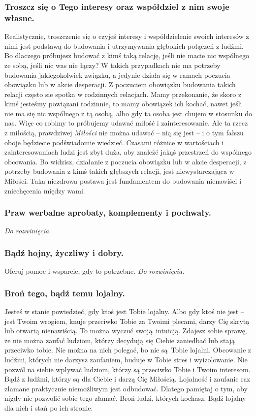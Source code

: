 \documentclass[../dotknieci-miloscia.tex]{subfiles}
\begin{document}
\subsubsection{Troszcz się o Tego interesy oraz współdziel z nim swoje własne.}
Realistycznie, troszczenie się o czyjeś interesy i współdzielenie swoich interesów z nimi 
jest podstawą do budowania i utrzymywania głębokich połączeń z ludźmi. 
Bo dlaczego próbujesz budować z kimś taką relację, 
jeśli nie macie nic wspólnego ze sobą, jeśli nic was nie łączy? 
W takich przypadkach nie ma potrzeby budowania jakiegokolwiek związku, 
a jedynie działa się w ramach poczucia obowiązku lub w akcie desperacji. 
Z poczuciem obowiązku budowania takich relacji często sie spotka w rodzinnych relacjach. 
Mamy przekonanie, że skoro z kimś jesteśmy powiązani rodzinnie,
to mamy obowiązek ich kochać, nawet jeśli nie ma się nic wspólnego z tą osobą, 
albo gdy ta osoba jest chujem w stosunku do nas. 
Więc co robimy to próbujemy udawać miłość i zainteresowanie. 
Ale ta rzecz z miłością, prawdziwej \emph{Miłości} nie można udawać 
-- nią się jest -- i o tym fałszu oboje będziecie podświadomie wiedzieć.
Czasami różnice w wartościach i zainteresowaniach ludzi jest zbyt duża, 
aby znaleźć jakąś przestrzeń do wspólnego obcowania. 
Bo widzisz, działanie z poczucia obowiązku lub w akcie desperacji, 
z potrzeby budowania z kimś takich głębszych relacji, jest niewystarczająca w Miłości. 
Taka niezdrowa postawa jest fundamentem do budowania nienawiści i zniechęcenia między wami. 

\subsubsection{Praw werbalne aprobaty, komplementy i pochwały.}
\emph{Do rozwinięcia.}

\subsubsection{Bądź hojny, życzliwy i dobry.}
Oferuj pomoc i wsparcie, gdy to potrzebne.
\emph{Do rozwinięcia.}

\subsubsection{Broń tego, bądź temu lojalny.}
Jesteś w stanie powiedzieć, gdy ktoś jest Tobie lojalny.
Albo gdy ktoś nie jest -- jest Twoim wrogiem, knuje przeciwko Tobie za Twoimi plecami, 
darzy Cię skrytą lub otwartą nienawiścią.
To można wyczuć swoją intuicją.
Zdajesz sobie sprawę, że nie można zaufać ludziom, 
którzy decydują się Ciebie zaniedbać lub stają przeciwko tobie.
Nie można na nich polegać, bo nie są Tobie lojalni.
Obcowanie z ludźmi, których nie darzysz zaufaniem, buduje w Tobie stres i wyizolowanie.
Nie pozwól na siebie wpływać ludziom, którzy są przeciwko Tobie i Twoim interesom.
Bądź z ludźmi, którzy są dla Ciebie i darzą Cię Miłością.
Lojalność i zaufanie raz złamane praktycznie niemożliwym jest odbudować.
Dlatego pamiętaj o tym, aby nigdy nie pozwolić sobie tego złamać.
Broń ludzi, których kochasz.
Bądź lojalny dla nich i stań po ich stronie.
\end{document}
